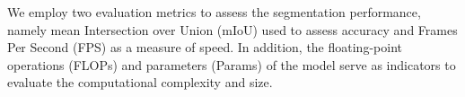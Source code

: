 \documentclass[preprint,12pt,authoryear]{elsarticle}
\begin{document}

We employ two evaluation metrics to assess the segmentation performance, namely mean Intersection over Union (mIoU) used to assess accuracy and Frames Per Second (FPS) as a measure of speed. In addition, the floating-point operations (FLOPs) and parameters (Params) of the model serve as indicators to evaluate the computational complexity and size.

\end{document}
